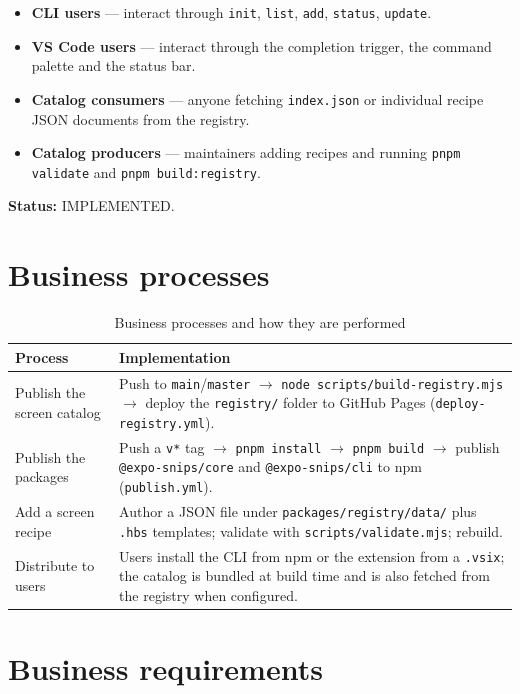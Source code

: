 \begin{itemize}
  \item \textbf{CLI users} --- interact through \texttt{init}, \texttt{list},
        \texttt{add}, \texttt{status}, \texttt{update}.
  \item \textbf{VS Code users} --- interact through the completion trigger, the
        command palette and the status bar.
  \item \textbf{Catalog consumers} --- anyone fetching \texttt{index.json} or
        individual recipe JSON documents from the registry.
  \item \textbf{Catalog producers} --- maintainers adding recipes and running
        \texttt{pnpm validate} and \texttt{pnpm build:registry}.
\end{itemize}

\textbf{Status:} IMPLEMENTED.

\section{Business processes}

\begin{longtable}{p{4cm}p{10.4cm}}
\caption{Business processes and how they are performed}\\
\toprule
\textbf{Process} & \textbf{Implementation} \\
\midrule

Publish the screen catalog & Push to \texttt{main}/\texttt{master} $\rightarrow$ \texttt{node scripts/build-registry.mjs} $\rightarrow$ deploy the \texttt{registry/} folder to GitHub Pages (\texttt{deploy-registry.yml}). \\
Publish the packages & Push a \texttt{v*} tag $\rightarrow$ \texttt{pnpm install} $\rightarrow$ \texttt{pnpm build} $\rightarrow$ publish \texttt{@expo-snips/core} and \texttt{@expo-snips/cli} to npm (\texttt{publish.yml}). \\
Add a screen recipe & Author a JSON file under \texttt{packages/registry/data/} plus \texttt{.hbs} templates; validate with \texttt{scripts/validate.mjs}; rebuild. \\
Distribute to users & Users install the CLI from npm or the extension from a \texttt{.vsix}; the catalog is bundled at build time and is also fetched from the registry when configured. \\
\bottomrule
\end{longtable}

\section{Business requirements}

